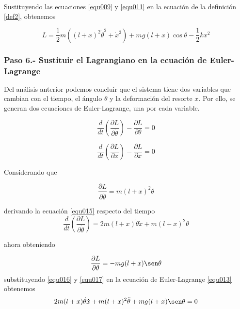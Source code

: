 \documentclass[12pt]{book}
\theoremstyle{definition}
\theoremstyle{remark}
\theoremstyle{plain}
\begin{document}
Sustituyendo las ecuaciones \ref{equ009} y \ref{equ011} en la ecuación de la definición \ref{def2}, obtenemos

\begin{equation}
\label{equ012}
L =  \frac{1}{2}m (  (l+x)^2 \dot{\theta} ^2 + \dot{x} ^2 )+ m g (l+x) \cos \theta-\frac{1}{2} k x^2
\end{equation}

\subsubsection{Paso 6.- Sustituir el Lagrangiano en la ecuación de Euler-Lagrange}

Del análisis anterior podemos concluir que el sistema tiene dos variables que cambian con el tiempo, el ángulo $\theta$ y la deformación del resorte $x$. Por ello, se generan dos ecuaciones de Euler-Lagrange, una por cada variable.

\begin{equation}
\label{equ013}
\frac{d}{d t} \left ( \frac{\partial L}{\partial \dot {\theta}} \right )- \frac{\partial L}{\partial \theta} = 0
\end{equation}

\begin{equation}
\label{equ014}
\frac{d}{d t} \left ( \frac{\partial L}{\partial \dot {x}} \right )- \frac{\partial L}{\partial x} = 0
\end{equation}

Considerando que

\begin{equation}
\label{equ015}
\frac{\partial L}{\partial \dot{\theta}}=m (l+x)^2 \dot{\theta}
\end{equation}

derivando la ecuación \ref{equ015} respecto del tiempo
\begin{equation}
\label{equ016}
\frac{d}{d t} \left ( \frac{\partial L}{\partial \dot{\theta}} \right )=2 m (l+x) \dot{\theta} \dot{x} + m (l+x)^2 \ddot{\theta}
\end{equation}

ahora obteniendo

\begin{equation}
\label{equ017}
 \frac{\partial L}{\partial \theta}=-m g (l+x) \sen \theta
\end{equation}
 substituyendo \ref{equ016} y \ref{equ017} en la ecuación de Euler-Lagrange \ref{equ013} obtenemos
\begin{equation}
\label{equ018}
 2 m (l+x) \dot{\theta} \dot{x} + m (l+x)^2\ddot{\theta}+m g (l+x) \sen \theta=0
\end{equation}
\end{document}
